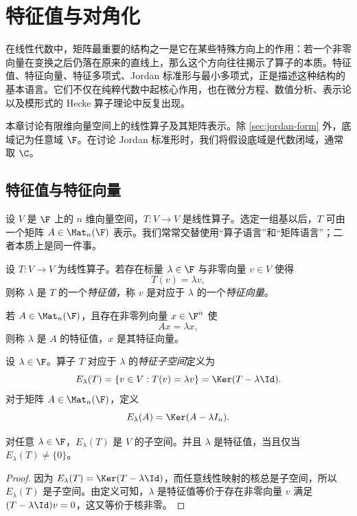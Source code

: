 \chapter{特征值与对角化}

在线性代数中，矩阵最重要的结构之一是它在某些特殊方向上的作用：若一个非零向量在变换之后仍落在原来的直线上，那么这个方向往往揭示了算子的本质。特征值、特征向量、特征多项式、Jordan 标准形与最小多项式，正是描述这种结构的基本语言。它们不仅在纯粹代数中起核心作用，也在微分方程、数值分析、表示论以及模形式的 Hecke 算子理论中反复出现。

本章讨论有限维向量空间上的线性算子及其矩阵表示。除 \cref{sec:jordan-form} 外，底域记为任意域 \(\F\)。在讨论 Jordan 标准形时，我们将假设底域是代数闭域，通常取 \(\C\)。

\section{特征值与特征向量}\label{sec:eigenvalues-vectors}

设 \(V\) 是 \(\F\) 上的 \(n\) 维向量空间，\(T\colon V\to V\) 是线性算子。选定一组基以后，\(T\) 可由一个矩阵 \(A\in \Mat_n(\F)\) 表示。我们常常交替使用“算子语言”和“矩阵语言”；二者本质上是同一件事。

\begin{definition}
设 \(T\colon V\to V\) 为线性算子。若存在标量 \(\lambda\in \F\) 与非零向量 \(v\in V\) 使得
\[
T(v)=\lambda v,
\]
则称 \(\lambda\) 是 \(T\) 的一个\emph{特征值}，称 \(v\) 是对应于 \(\lambda\) 的一个\emph{特征向量}。

若 \(A\in \Mat_n(\F)\)，且存在非零列向量 \(x\in \F^n\) 使
\[
Ax=\lambda x,
\]
则称 \(\lambda\) 是 \(A\) 的特征值，\(x\) 是其特征向量。
\end{definition}

\begin{definition}
设 \(\lambda\in \F\)。算子 \(T\) 对应于 \(\lambda\) 的\emph{特征子空间}定义为
\[
E_\lambda(T)=\{v\in V:T(v)=\lambda v\}=\Ker(T-\lambda \Id).
\]
对于矩阵 \(A\in \Mat_n(\F)\)，定义
\[
E_\lambda(A)=\Ker(A-\lambda I_n).
\]
\end{definition}

\begin{proposition}
对任意 \(\lambda\in \F\)，\(E_\lambda(T)\) 是 \(V\) 的子空间。并且 \(\lambda\) 是特征值，当且仅当 \(E_\lambda(T)\neq \{0\}\)。
\end{proposition}

\begin{proof}
因为 \(E_\lambda(T)=\Ker(T-\lambda\Id)\)，而任意线性映射的核总是子空间，所以 \(E_\lambda(T)\) 是子空间。由定义可知，\(\lambda\) 是特征值等价于存在非零向量 \(v\) 满足 \((T-\lambda\Id)v=0\)，这又等价于核非零。
\end{proof}

